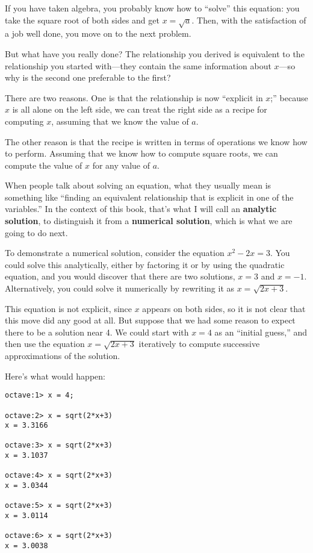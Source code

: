 If you have taken algebra, you probably know how to ``solve'' this
equation: you take the square root of both sides and get
$x = \sqrt{a}$. Then, with the satisfaction of a job well done,
you move on to the next problem.

But what have you really done? The relationship you derived is
equivalent to the relationship you started with---they contain the
same information about $x$---so why is the second one preferable
to the first?

There are two reasons. One is that the relationship is now ``explicit
in $x$;'' because $x$ is all alone on the left side, we can treat
the right side as a recipe for computing $x$, assuming that we
know the value of $a$.

The other reason is that the recipe is written in terms of operations
we know how to perform. Assuming that we know how to compute square
roots, we can compute the value of $x$ for any value of $a$.

When people talk about solving an equation, what they usually mean
is something like ``finding an equivalent relationship that is
explicit in one of the variables.'' In the context of this book,
that's what I will call an {\bf analytic solution}, to distinguish
it from a {\bf numerical solution}, which is what we are going to
do next.

To demonstrate a numerical solution, consider the equation $x^2 - 2x =
3$. You could solve this analytically, either by factoring it or by
using the quadratic equation, and you would discover that there are
two solutions, $x=3$ and $x=-1$. Alternatively, you could solve it
numerically by rewriting it as $x = \sqrt{2x+3}$.

This equation is not explicit, since $x$ appears on both sides, so
it is not clear that this move did any good at all. But suppose
that we had some reason to expect there to be a solution near 4.
We could start with $x=4$ as an ``initial guess,'' and then use
the equation $x = \sqrt{2x+3}$ iteratively to compute successive
approximations of the solution.

Here's what would happen:

\begin{verbatim}
octave:1> x = 4;

octave:2> x = sqrt(2*x+3)
x = 3.3166

octave:3> x = sqrt(2*x+3)
x = 3.1037

octave:4> x = sqrt(2*x+3)
x = 3.0344

octave:5> x = sqrt(2*x+3)
x = 3.0114

octave:6> x = sqrt(2*x+3)
x = 3.0038
\end{verbatim}


